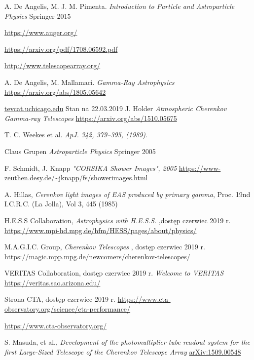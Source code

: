 \documentclass[a4paper,11pt,twoside]{article}
\begin{document}
\newpage

\begin{thebibliography}{9}
A. De Angelis, M. J. M. Pimenta.
\textit{Introduction to Particle and Astroparticle Physics} Springer 2015

\url{https://www.auger.org/}

\url{https://arxiv.org/pdf/1708.06592.pdf}

\url{http://www.telescopearray.org/}

A. De Angelis, M. Mallamaci.
\textit{Gamma-Ray Astrophysics} 
\url{https://arxiv.org/abs/1805.05642}

\url{tevcat.uchicago.edu}
Stan na 22.03.2019
J. Holder
\textit{Atmospheric Cherenkov Gamma-ray Telescopes}
\url{https://arxiv.org/abs/1510.05675}

T. C. Weekes et al.
\textit{ApJ. 342, 379–395, (1989).}

Claus Grupen
\textit{Astroparticle Physics} Springer 2005

F. Schmidt, J. Knapp
\textit{"CORSIKA Shower Images", 2005}
\url{https://www-zeuthen.desy.de/~jknapp/fs/showerimages.html}

A. Hillas, 
\textit{Cerenkov light images of EAS produced by primary gamma},
Proc. 19nd I.C.R.C. (La Jolla), Vol 3, 445 (1985)

H.E.S.S  Collaboration,
\textit{Astrophysics with H.E.S.S.}
,dostęp czerwiec 2019 r. 
\url{https://www.mpi-hd.mpg.de/hfm/HESS/pages/about/physics/}

 M.A.G.I.C.  Group,
\textit{Cherenkov Telescopes}
, dostęp czerwiec 2019 r. 
\url{https://magic.mpp.mpg.de/newcomers/cherenkov-telescopes/}

VERITAS Collaboration, dostęp czerwiec 2019 r. 
\textit{Welcome to VERITAS }
\url{https://veritas.sao.arizona.edu/}

Strona CTA, dostęp czerwiec 2019 r.
\url{https://www.cta-observatory.org/science/cta-performance/}

\url{https://www.cta-observatory.org/}

S. Masuda, et al., 
\textit{Development of the photomultiplier tube readout
system for the first Large-Sized Telescope of the
Cherenkov Telescope Array}
\url{arXiv:1509.00548}


\end{thebibliography}
\end{document}
